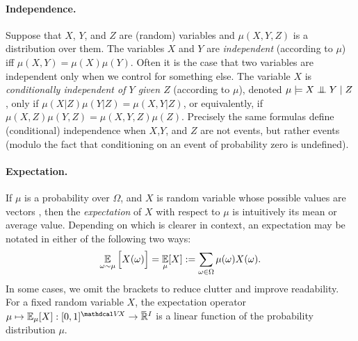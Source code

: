 \paragraph{%
    Independence.} 
Suppose that $X$, $Y$, and $Z$ are (random) variables and $\mu(X,Y,Z)$ is a distribution over them.
The variables $X$ and $Y$ are \emph{independent} (according to $\mu$) iff $\mu(X,Y) = \mu(X)\mu(Y)$.
Often it is the case that two variables are independent only when we control for something else.
The variable ${X}$ is \emph{conditionally independent of ${Y}$ given ${Z}$} 
(according to $\mu$),  denoted 
$\mu \models {X} \mathrel{\perp\mspace{-10mu}\perp} {Y} \mid {Z}$, 
only if $\mu(X | Z) \mu(Y | Z) = \mu(X,Y| Z)$,
or equivalently, if
$\mu(X,Z) \mu(Y,Z) = \mu(X,Y,Z) \mu(Z)$. 
Precisely the same formulas define (conditional) independence
    when $X$,$Y$, and $Z$ are not events, but rather events
    (modulo the fact that conditioning on an event of probability zero is undefined).





\paragraph{Expectation.%
    } 
If $\mu$ is a probability over $\Omega$, and $X$ is random variable 
whose possible values are vectors 
\unskip, then the \emph{expectation} of $X$ with respect to $\mu$ is intuitively its mean or average value.
Depending on which is clearer in context, 
    an expectation may be notated in either of the following two ways:
\[
    \operatorname*{\mathbb{E}}_{\omega \sim \mu} \Big[ X(\omega) \Big]
        = \operatorname*{\mathbb{E}}_{\mu}[ X ]  
        := \sum_{\omega \in \Omega} \mu(\omega) X(\omega).
\]
In some cases, we omit the brackets to reduce clutter and improve readability.
For a fixed random variable $X$, the expectation operator $\mu \mapsto \Ex_\mu[X] : [0,1]^{\V\! X} \to \Rext^I$ is a linear function of the probability distribution $\mu$.


